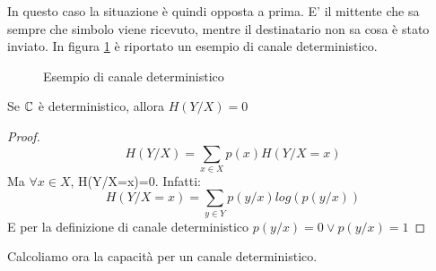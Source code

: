 In questo caso la situazione è quindi opposta a prima. E' il mittente che sa sempre che simbolo viene ricevuto, mentre 
il destinatario non sa cosa è stato inviato.
In figura \ref{fig:deterministico} è riportato un esempio di canale deterministico.

\begin{figure}[htbp]
  \centering
  \hspace{1cm}
  \caption{Esempio di canale deterministico}
  \label{fig:deterministico}
\end{figure}

\begin{lemma}
 Se $\mathbb{C}$ è deterministico, allora $H(Y/X)=0$
 \begin{proof}
  \[
   H(Y/X)=\sum_{x \in X} p(x)H(Y/X=x)
  \]
  Ma $\forall x \in X$, H(Y/X=x)=0. Infatti:
  \[
   H(Y/X=x)=\sum_{y \in Y}p(y/x) log(p(y/x))
  \]
  E per la definizione di canale deterministico $p(y/x)=0 \lor p(y/x)=1$
 \end{proof}
\end{lemma}

Calcoliamo ora la capacità per un canale deterministico.

